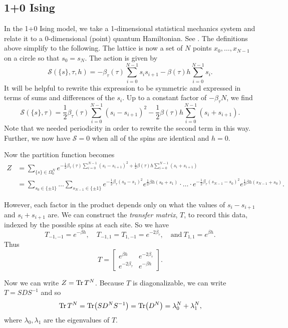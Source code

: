 \documentclass[10pt,reqno]{amsart}
\begin{document}
	\subsection{1+0 Ising}
	
	In the 1+0 Ising model, we take a 1-dimensional statistical mechanics system and relate it to a 0-dimensional (point) quantum Hamiltonian. See \cite{FradkinSusskind78,KogutGaugeSummary}.
	The definitions above simplify to the following. The lattice is now a set of $N$ points $x_0,\ldots,x_{N-1}$ on a circle so that $s_0=s_N$. The action is given by 
		\[\mathcal{S}(\{s\},\tau, h)=-\beta_\tau(\tau)\sum_{i=0}^{N-1} s_is_{i+1} - \beta(\tau)h\sum_{i=0}^{N-1}s_i. \] 
	It will be helpful to rewrite this expression to be symmetric and expressed in terms of sums and differences of the $s_i$. 
	Up to a constant factor of $-\beta_\tau N$, we find
		\[\mathcal{S}(\{s\},\tau)=\frac{1}{2}\beta_\tau(\tau)\sum_{i=0}^{N-1} (s_i-s_{i+1})^2 - \frac{1}{2}\beta(\tau)h\sum_{i=0}^{N-1}(s_i+s_{i+1}). \]
	Note that we needed periodicity in order to rewrite the second term in this way. Further, we now have $\mathcal{S}=0$ when all of the spins are identical and $h=0$.
	
	Now the partition function becomes 
	\begin{align*}
		Z&=\sum_{\{s\}\in\Omega_0^N} e^{-\frac{1}{2}\beta_\tau(\tau)\sum_{i=0}^{N-1} (s_i-s_{i+1})^2 + \frac{1}{2}\beta(\tau)h\sum_{i=0}^{N-1}(s_i+s_{i+1})} \\
		&=\sum_{s_0 \in \{\pm 1\}} \ldots \sum_{s_{N-1}\in \{\pm 1\}} e^{-\frac{1}{2}\beta_\tau (s_0-s_1)^2}e^{\frac{1}{2}\beta h(s_0+s_1)}\cdot\ldots\cdot e^{-\frac{1}{2}\beta_\tau (s_{N-1}-s_0)^2}e^{\frac{1}{2}\beta h(s_{N-1}+s_0)}.
	\end{align*}
	
	However, each factor in the product depends only on what the values of $s_i-s_{i+1}$ and $s_i+s_{i+1}$ are. 
	We can construct the \emph{transfer matrix}, $T$, to record this data, indexed by the possible spins at each site.
	So we have 
	\[T_{-1,-1}=e^{-\beta h}, \quad T_{-1,1}=T_{1,-1}=e^{-2\beta_\tau}, \quad \text{and}\ T_{1,1}=e^{\beta h}. \] 
	Thus \[T=\begin{bmatrix}
	e^{\beta h} & e^{-2\beta_\tau} \\
	e^{-2\beta_\tau} & e^{-\beta h}
	\end{bmatrix}. \]
	
	Now we can write $Z=\Tr T^N$.
	Because $T$ is diagonalizable, we can write $T=SDS^{-1}$ and so 
		\[\Tr T^N=\Tr(SD^NS^{-1})=\Tr(D^N)=\lambda_0^N+\lambda_1^N,\]
	where $\lambda_0,\lambda_1$ are the eigenvalues of $T$.
	
\end{document}
